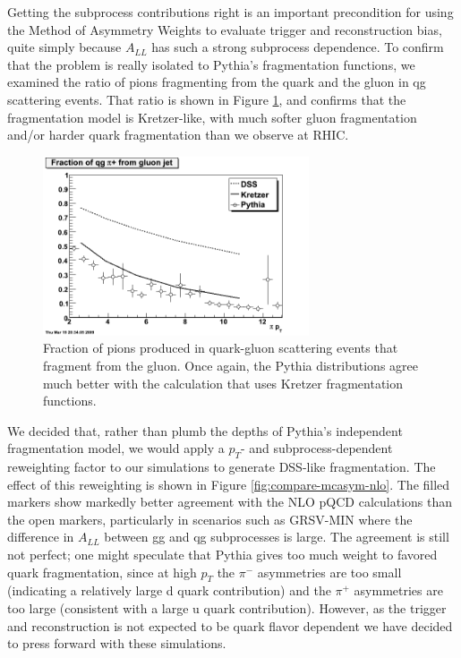 Getting the subprocess contributions right is an important precondition for using the Method of Asymmetry Weights to evaluate trigger and reconstruction bias, quite simply because $A_{LL}$ has such a strong subprocess dependence.  To confirm that the problem is really isolated to Pythia's fragmentation functions, we examined the ratio of pions fragmenting from the quark and the gluon in qg scattering events.  That ratio is shown in Figure \ref{fig:qg-fragmentation}, and confirms that the fragmentation model is Kretzer-like, with much softer gluon fragmentation and/or harder quark fragmentation than we observe at RHIC.

\begin{figure}
  \begin{center}
    \includegraphics[width=0.7\textwidth]{figures/qg-fragmentation}
  \end{center}
  \caption{Fraction of pions produced in quark-gluon scattering events that
  fragment from the gluon. Once again, the Pythia distributions agree much
  better with the calculation that uses Kretzer fragmentation functions.}
  \label{fig:qg-fragmentation}
\end{figure}

We decided that, rather than plumb the depths of Pythia's independent fragmentation model, we would apply a $p_{T}$- and subprocess-dependent reweighting factor to our simulations to generate DSS-like fragmentation.  The effect of this reweighting is shown in Figure \ref{fig:compare-mcasym-nlo}.  The filled markers show markedly better agreement with the NLO pQCD calculations than the open markers, particularly in scenarios such as GRSV-MIN where the difference in $A_{LL}$ between gg and qg subprocesses is large.  The agreement is still not perfect; one might speculate that Pythia gives too much weight to favored quark fragmentation, since at high $p_{T}$ the $\pi^{-}$ asymmetries are too small (indicating a relatively large d quark contribution) and the $\pi^{+}$ asymmetries are too large (consistent with a large u quark contribution).  However, as the trigger and reconstruction is not expected to be quark flavor dependent we have decided to press forward with these simulations.

